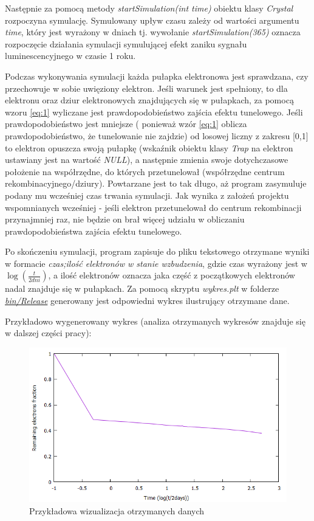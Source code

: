 Następnie za pomocą metody \textit{startSimulation(int time)} obiektu klasy \textit{Crystal} rozpoczyna symulację. Symulowany upływ czasu  zależy od wartości argumentu \textit{time}, który jest wyrażony w dniach tj. wywołanie \emph{startSimulation(365)} oznacza rozpoczęcie działania symulacji symulującej efekt zaniku sygnału luminescencyjnego w czasie 1 roku.

Podczas wykonywania symulacji każda pułapka elektronowa jest sprawdzana, czy przechowuje w sobie uwięziony elektron. Jeśli warunek jest spełniony, to dla elektronu oraz dziur elektronowych znajdujących się w pułapkach, za pomocą wzoru \ref{eq:1} wyliczane jest prawdopodobieństwo zajścia efektu tunelowego. Jeśli prawdopodobieństwo jest mniejsze ( ponieważ wzór \ref{eq:1} oblicza prawdopodobieństwo, że tunelowanie nie zajdzie) od losowej liczny z zakresu [0,1] to elektron opuszcza swoją pułapkę (wskaźnik obiektu klasy \textit{Trap} na elektron ustawiany jest na wartość \textit{NULL}), a następnie zmienia swoje dotychczasowe położenie na współrzędne, do których przetunelował (współrzędne centrum rekombinacyjnego/dziury). Powtarzane jest to tak długo, aż program zasymuluje podany mu wcześniej czas trwania symulacji.  Jak wynika z założeń projektu wspomnianych wcześniej - jeśli elektron przetunelował do centrum rekombinacji przynajmniej raz, nie będzie on brał więcej udziału w obliczaniu prawdopodobieństwa zajścia efektu tunelowego. 

Po skończeniu symulacji, program zapisuje do pliku tekstowego otrzymane wyniki w formacie \textit{czas;ilość elektronów w stanie wzbudzenia}, gdzie czas wyrażony jest w $ \log(\frac{t}{2 dni}) $, a ilość elektronów oznacza jaka część z początkowych elektronów nadal znajduje się w pułapkach. Za pomocą skryptu \textit{wykres.plt}
w folderze \href{https://github.com/Sharkuu/Dissertation/tree/master/bin/Release}{\textit{bin/Release}} generowany jest odpowiedni wykres ilustrujący otrzymane dane. 

Przykładowo wygenerowany wykres (analiza otrzymanych wykresów znajduje się w dalszej części pracy):

\begin{figure}[H]
\centering
\includegraphics[width=15cm]{wykres1}
\caption{Przykładowa wizualizacja otrzymanych danych}
\label{fig:example}
\end{figure}

